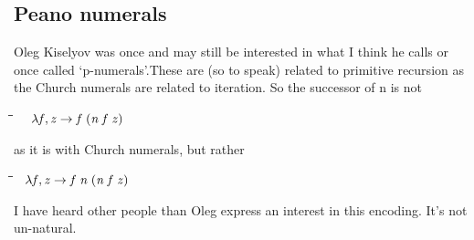 \documentclass{article}
\newlength{\lwidth}\setlength{\lwidth}{4.5cm}
\newlength{\cwidth}\setlength{\cwidth}{8mm} %
\newcommand{\Varid}[1]{\mathit{#1}}
\begin{document}
\subsection{Peano numerals}

Oleg Kiselyov
was once and may still be interested in what I think he calls or once called `p-numerals'.These 
are (so to speak) related to primitive recursion as the Church
numerals are related to iteration.  So the successor of n is 
not 
\begin{tabbing}
\qquad\=\hspace{\lwidth}\=\hspace{\cwidth}\=\+\kill
${\hskip1.00em\relax\lambda \Varid{f},\Varid{z}\to \Varid{f}\;(\Varid{n}\;\Varid{f}\;\Varid{z})}$
\end{tabbing}as it is with Church numerals, but rather
\begin{tabbing}
\qquad\=\hspace{\lwidth}\=\hspace{\cwidth}\=\+\kill
${\hskip0.50em\relax\lambda \Varid{f},\Varid{z}\to \Varid{f}\;\Varid{n}\;(\Varid{n}\;\Varid{f}\;\Varid{z})}$
\end{tabbing}I have heard other people than Oleg express an interest in this encoding. It's not un-natural. 
\end{document}
